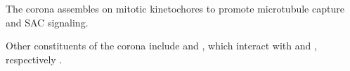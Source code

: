 The corona assembles on mitotic kinetochores to promote microtubule capture and SAC signaling.

Other constituents of the corona include  and , which interact with  and , respectively \cite{CENPELocalization-BUBR1, CENP-FLimitsStripping}.

